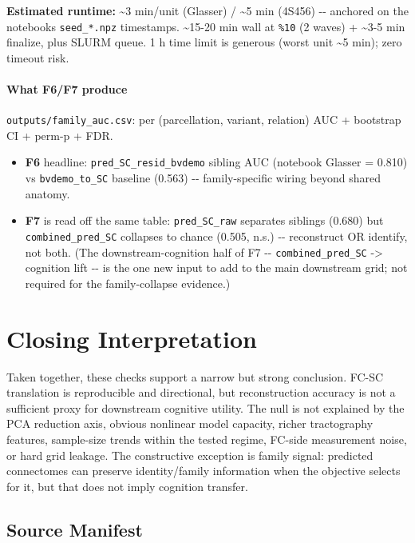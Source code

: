\textbf{Estimated runtime:} \textasciitilde3 min/unit (Glasser) / \textasciitilde5 min (4S456) -\/- anchored on the notebook\textquotesingle s \texttt{seed\_*.npz} timestamps. \textasciitilde15-20 min wall at \texttt{\%10} (2 waves) + \textasciitilde3-5 min finalize, plus SLURM queue. 1 h time limit is generous (worst unit \textasciitilde5 min); zero timeout risk.

\paragraph{What F6/F7 produce}\label{what-f6f7-produce}

\texttt{outputs/family\_auc.csv}: per (parcellation, variant, relation) AUC + bootstrap CI + perm-p + FDR.

\begin{itemize}
\tightlist
\item
  \textbf{F6} headline: \texttt{pred\_SC\_resid\_bvdemo} sibling AUC (notebook Glasser = 0.810) vs \texttt{bvdemo\_to\_SC} baseline (0.563) -\/- family-specific wiring beyond shared anatomy.
\item
  \textbf{F7} is read off the same table: \texttt{pred\_SC\_raw} separates siblings (0.680) but \texttt{combined\_pred\_SC} collapses to chance (0.505, n.s.) -\/- reconstruct OR identify, not both. (The downstream-cognition half of F7 -\/- \texttt{combined\_pred\_SC} -\textgreater{} cognition lift -\/- is the one new input to add to the main downstream grid; not required for the family-collapse evidence.)
\end{itemize}

\section{Closing Interpretation}\label{closing-interpretation}

Taken together, these checks support a narrow but strong conclusion. FC-SC translation is reproducible and directional, but reconstruction accuracy is not a sufficient proxy for downstream cognitive utility. The null is not explained by the PCA reduction axis, obvious nonlinear model capacity, richer tractography features, sample-size trends within the tested regime, FC-side measurement noise, or hard grid leakage. The constructive exception is family signal: predicted connectomes can preserve identity/family information when the objective selects for it, but that does not imply cognition transfer.

\subsection{Source Manifest}\label{source-manifest}

